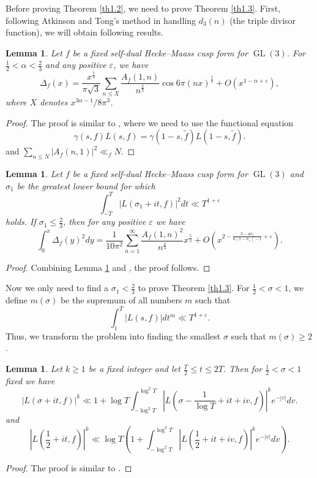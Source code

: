 \documentclass[10pt,leqno]{amsart}
\numberwithin{equation}{section}
\newtheorem{lemma}[definition]{{Lemma}}
\begin{document}
Before proving Theorem \ref{th1.2}, we need to  prove Theorem \ref{th1.3}. First, following Atkinson \cite{MR6190} and  Tong's method \cite{MR98718} in handling $d_3(n)$ (the triple divisor function), we will obtain following results.
\begin{lemma}\label{le3.1}
    Let $f$ be a fixed self-dual Hecke--Maass cusp form  for $\operatorname{GL}(3)$. For $\frac{1}{2}<\alpha<\frac{2}{3}$ and  any positive $\varepsilon$, we have
    \[
    \Delta_f(x)=\frac{x^\frac{1}{3}}{\pi \sqrt{3}}\sum_{n\leqslant X}\frac{A_f(1,n)}{n^{\frac{2}{3}}}\cos{6\pi (nx)^{\frac{1}{3}}}+O(x^{1-\alpha+\varepsilon}),
    \]
    where $X$ denotes $x^{3\alpha-1}/8\pi^3$. 
\end{lemma}
\begin{proof}
    The proof is similar to \cite{MR6190} , where we need to use the functional equation
    \[
    \gamma(s, f) L(s, f)=\gamma(1-s, \tilde{f}) L(1-s, \tilde{f}) .
    \]
    and $\sum_{n \leqslant N}|A_f(n, 1)|^2 \ll_f N$.
\end{proof}
\begin{lemma}\label{pro4.1}
Let $f$ be a fixed self-dual Hecke--Maass cusp form  for $\operatorname{GL}(3)$ and $\sigma_1$ be the greatest lower bound for which
\[
\int_{-T}^{T}\left|L\left(\sigma_1+it,f\right)\right|^2dt\ll T^{1+\varepsilon}
\]
holds.
    If $\sigma_1\leqslant\frac{2}{3}$, then for any positive $\varepsilon$ we have
    \[
    \int_{0}^{x}\Delta_f\left(y\right)^2dy=\frac{1}{10\pi^2}\sum_{n=1}^\infty\frac{A_f\left(1,n\right)^2}{n^{\frac{4}{3}}}x^{\frac{5}{3}}+O\left(x^{2-\frac{3-4\sigma_1}{6\left(1-\sigma_1\right)-1}+\varepsilon}\right).
    \]
\end{lemma}

\begin{proof}
    Combining Lemma \ref{le3.1} and \cite[Theorem 1]{MR98718}, the proof follows.
\end{proof}

Now we only need to find a $\sigma_1<\frac{2}{3}$  to prove Theorem \ref{th1.3}. For $\frac{1}{2}<\sigma<1$, we define $m(\sigma)$ be the supremum of all numbers  $m$ such that
\begin{equation}\label{def m}
    \int_1^T\left|L(s,f)\right|dt^m\ll T^{1+\varepsilon}.
\end{equation}
Thus, we transform the problem into finding the smallest $\sigma$ such that $m(\sigma)\geqslant 2$.
\begin{lemma}\label{le4.10}
    Let $k\geqslant 1$ be a fixed integer and let $\frac{T}{2}\leqslant t \leqslant 2T$. Then for $\frac{1}{2}<  \sigma <1$ fixed we have 
    \begin{equation}\label{eq4.41}
        |L(\sigma+it ,f)|^k\ll 1+\log T \int_{-\log^2T}^{\log^2T}\left| L\left(\sigma-\frac{1}{\log T}+it+iv,f\right)\right|^ke^{-|v|}dv.
    \end{equation}
    and 
    \[
    \left|L(\frac{1}{2}+it,f)\right|^k\ll \log T\left(1+\int_{-\log^2T}^{\log ^2 T}\left|L(\frac{1}{2}+it+iv,f)\right|^ke^{-|v|}dv\right).
    \]
\end{lemma}
\begin{proof}
    The proof is similar to \cite[Lemma 7.1]{MR792089}.
\end{proof}
\end{document}
